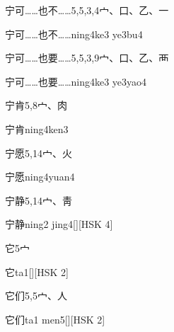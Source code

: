 \begin{entry}{宁可……也不……}{5,5,3,4}{⼧、⼝、⼄、⼀}
  \begin{phonetics}{宁可……也不……}{ning4ke3 ye3bu4}
  \end{phonetics}
\end{entry}

\begin{entry}{宁可……也要……}{5,5,3,9}{⼧、⼝、⼄、⾑}
  \begin{phonetics}{宁可……也要……}{ning4ke3 ye3yao4}
  \end{phonetics}
\end{entry}

\begin{entry}{宁肯}{5,8}{⼧、⾁}
  \begin{phonetics}{宁肯}{ning4ken3}
  \end{phonetics}
\end{entry}

\begin{entry}{宁愿}{5,14}{⼧、⽕}
  \begin{phonetics}{宁愿}{ning4yuan4}
  \end{phonetics}
\end{entry}

\begin{entry}{宁静}{5,14}{⼧、⾭}
  \begin{phonetics}{宁静}{ning2 jing4}[][HSK 4]
  \end{phonetics}
\end{entry}

\begin{entry}{它}{5}{⼧}
  \begin{phonetics}{它}{ta1}[][HSK 2]
  \end{phonetics}
\end{entry}

\begin{entry}{它们}{5,5}{⼧、⼈}
  \begin{phonetics}{它们}{ta1 men5}[][HSK 2]
  \end{phonetics}
\end{entry}

